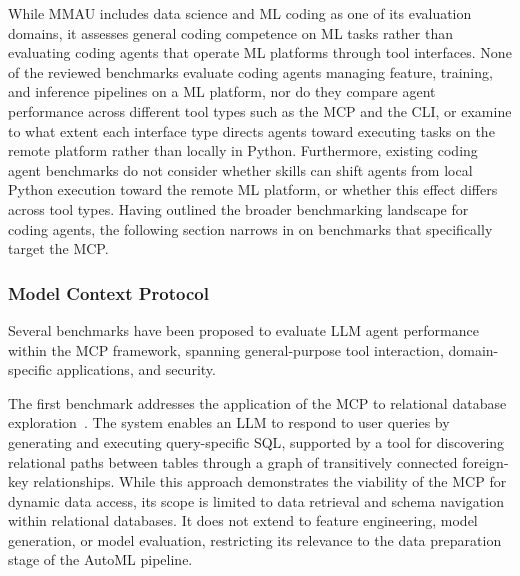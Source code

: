 \documentclass[
english,                 %
bibtex,                  %
includeExtraAbstracts, %
]{kththesis}
\numberwithin{listing}{chapter}
\begin{document}
While \gls{MMAU} includes data science and \gls{ML} coding as one of its evaluation domains, it assesses general coding competence on \gls{ML} tasks rather than evaluating coding agents that operate \gls{ML} platforms through tool interfaces. None of the reviewed benchmarks evaluate coding agents managing feature, training, and inference pipelines on a \gls{ML} platform, nor do they compare agent performance across different tool types such as the \gls{MCP} and the \gls{CLI}, or examine to what extent each interface type directs agents toward executing tasks on the remote platform rather than locally in Python. Furthermore, existing coding agent benchmarks do not consider whether skills can shift agents from local Python execution toward the remote \gls{ML} platform, or whether this effect differs across tool types. Having outlined the broader benchmarking landscape for coding agents, the following section narrows in on benchmarks that specifically target the \gls{MCP}.

\subsubsection{Model Context Protocol}

Several benchmarks have been proposed to evaluate \gls{LLM} agent performance within the \gls{MCP} framework, spanning general-purpose tool interaction, domain-specific applications, and security.

The first benchmark addresses the application of the \gls{MCP} to relational database exploration~\cite{bramer_toolbelt-mcp_2026}. The system enables an \gls{LLM} to respond to user queries by generating and executing query-specific \gls{SQL}, supported by a tool for discovering relational paths between tables through a graph of transitively connected foreign-key relationships. While this approach demonstrates the viability of the \gls{MCP} for dynamic data access, its scope is limited to data retrieval and schema navigation within relational databases. It does not extend to feature engineering, model generation, or model evaluation, restricting its relevance to the data preparation stage of the \gls{AutoML} pipeline.
\end{document}
